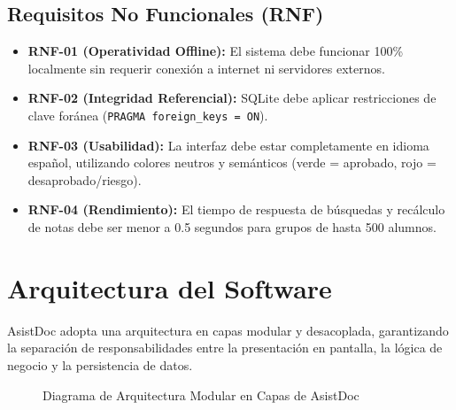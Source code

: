 \documentclass[12pt,a4paper]{article}
\begin{document}
\subsection{Requisitos No Funcionales (RNF)}
\begin{itemize}
    \item \textbf{RNF-01 (Operatividad Offline):} El sistema debe funcionar 100\% localmente sin requerir conexión a internet ni servidores externos.
    \item \textbf{RNF-02 (Integridad Referencial):} SQLite debe aplicar restricciones de clave foránea (\texttt{PRAGMA foreign\_keys = ON}).
    \item \textbf{RNF-03 (Usabilidad):} La interfaz debe estar completamente en idioma español, utilizando colores neutros y semánticos (verde = aprobado, rojo = desaprobado/riesgo).
    \item \textbf{RNF-04 (Rendimiento):} El tiempo de respuesta de búsquedas y recálculo de notas debe ser menor a 0.5 segundos para grupos de hasta 500 alumnos.
\end{itemize}

\section{Arquitectura del Software}
AsistDoc adopta una arquitectura en capas modular y desacoplada, garantizando la separación de responsabilidades entre la presentación en pantalla, la lógica de negocio y la persistencia de datos.

\begin{figure}[h!]
\centering
{}
\caption{Diagrama de Arquitectura Modular en Capas de AsistDoc}
\end{figure}
\end{document}
